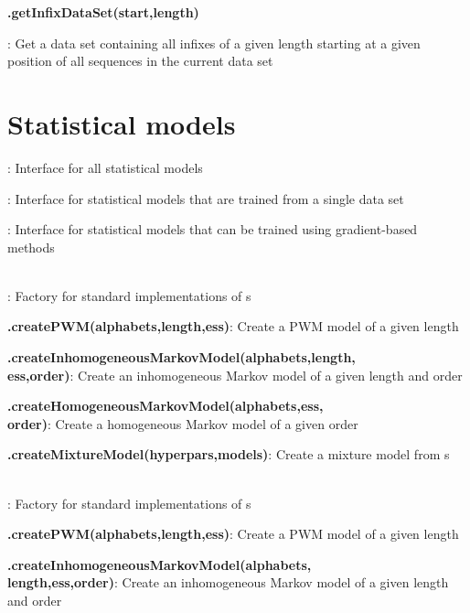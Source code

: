 \documentclass[10pt]{scrartcl}
\newcommand{\entry}[3]{{\item[]\bfseries #1#2}: #3}
\newcommand{\entrys}[3]{\item[\emph{static}] {\bfseries {#1#2}}: #3}
\newcommand{\sep}{\\~\vspace{-0.1cm}}
\begin{document}
\begin{flushleft}
\begin{itemize*}
\entry{\DataSet}{.getInfixDataSet(start,length)}{Get a data set containing all infixes of a given length starting at a given position of all sequences in the current data set}
\end{itemize*}

\section{Statistical models}

\begin{itemize*}

\entry{\StatMod}{}{Interface for all statistical models}

\entry{\TrainSM}{}{Interface for statistical models that are trained from a single data set}


\entry{\DiffSM}{}{Interface for statistical models that can be trained using gradient-based methods}\sep


\entry{\TrainSMFactory}{}{Factory for standard implementations of \TrainSM s}

\entrys{\TrainSMFactory}{.createPWM(alphabets,length,ess)}{Create a PWM model of a given length}

\entrys{\TrainSMFactory}{.createInhomogeneousMarkovModel(alphabets,length,\\ess,order)}{Create an inhomogeneous Markov model of a given length and order}

\entrys{\TrainSMFactory}{.createHomogeneousMarkovModel(alphabets,ess,\\order)}{Create a homogeneous Markov model of a given order}

\entrys{\TrainSMFactory}{.createMixtureModel(hyperpars,models)}{Create a mixture model from \TrainSM s}\sep

\entry{\DiffSMFactory}{}{Factory for standard implementations of \DiffSM s}

\entrys{\DiffSMFactory}{.createPWM(alphabets,length,ess)}{Create a PWM model of a given length}

\entrys{\DiffSMFactory}{.createInhomogeneousMarkovModel(alphabets,\\length,ess,order)}{Create an inhomogeneous Markov model of a given length and order}


\end{itemize*}
\end{flushleft}
\end{document}
